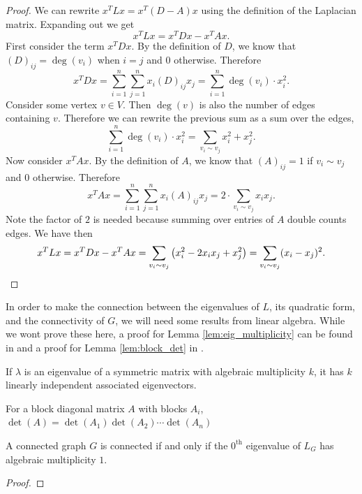 \documentclass[12pt]{article}
\begin{document}
\begin{proof}
    We can rewrite $x^T L x = x^T (D - A) x$ using the definition of the Laplacian matrix. Expanding out we get
    \[
        x^T L x = x^T D x - x^T A x
    .\]
    First consider the term $x^T D x$. By the definition of $D$, we know that $(D)_{ij} = \deg(v_i)$ when $i = j$ and $0$ otherwise. Therefore
    \[
        x^T D x = \sum_{i=1}^n \sum_{j=1}^n x_i (D)_{ij} x_j = \sum_{i=1}^n \deg(v_i) \cdot x_i^2
    .\]
    Consider some vertex $v \in V$. Then $\deg(v)$ is also the number of edges containing $v$. Therefore we can rewrite the previous sum as a sum over the edges,
    \[
        \sum_{i=1}^n \deg(v_i) \cdot x_i^2 = \sum_{v_i \sim v_j} x_i^2 + x_j^2
    .\]
    Now consider $x^T A x$. By the definition of $A$, we know that $(A)_{ij} = 1$ if $v_i \sim v_j$ and $0$ otherwise. Therefore
    \[
        x^T A x = \sum_{i=1}^n \sum_{j=1}^n x_i (A)_{ij} x_j = 2 \cdot\sum_{v_i \sim v_j} x_i x_j
    .\]
    Note the factor of $2$ is needed because summing over entries of $A$ double counts edges. We have then
    \[
        x^T L x = x^T D x - x^T A x = \sum_{v_i \sim v_j} \qty(x_i^2 - 2 x_i x_j + x_j^2) = \sum_{v_i \sim v_j} (x_i - x_j)^2
        .\qedhere
    \]
\end{proof}

In order to make the connection between the eigenvalues of $L$, its quadratic form, and the connectivity of $G$, we will need some results from linear algebra. While we wont prove these here, a proof for Lemma \ref{lem:eig_multiplicity} can be found in \cite{} and a proof for Lemma \ref{lem:block_det} in \cite{silvester2000determinants}.

\begin{lemma}
    \label{lem:eig_multiplicity}
    If $\lambda$ is an eigenvalue of a symmetric matrix with algebraic multiplicity $k$, it has $k$ linearly independent associated eigenvectors.
\end{lemma}

\begin{lemma}
    \label{lem:block_det}
    For a block diagonal matrix $A$ with blocks $A_i$, $\det(A) = \det(A_1) \det(A_2) \cdots \det(A_n)$
\end{lemma}

\begin{lemma}
    A connected graph $G$ is connected if and only if the $0^\text{th}$ eigenvalue of $L_G$ has algebraic multiplicity $1$.
\end{lemma}
\begin{proof}
\end{proof}
\end{document}
